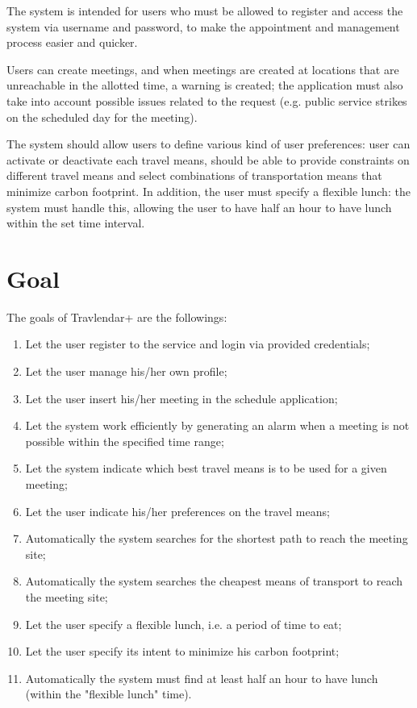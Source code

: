 \documentclass{report}
\begin{document}
	\bigskip
	The system is intended for users who must be allowed to register and access the system via username and password, to make the appointment and management process easier and quicker.

	Users can create meetings, and when meetings are created at locations that are unreachable in the allotted time, a warning is created; the application must also take into account possible issues related to the request (e.g. public service strikes on the scheduled day for the meeting). 
	
	\bigskip
	The system should allow users to define various kind of user preferences: user can activate or deactivate each travel means, should be able to provide constraints on different travel means and select combinations of transportation means that minimize carbon footprint. In addition, the user must specify a flexible lunch: the system must handle this, allowing the user to have half an hour to have lunch within the set time interval.
	
	
	\section{Goal}
	The goals of Travlendar+ are the followings:

	\begin{enumerate}
	\item Let the user register to the service and login via provided credentials;
	\item Let the user manage his/her own profile;
	\item Let the user insert his/her meeting in the schedule application;
	\item Let the system work efficiently by generating an alarm when a meeting is not possible within the specified time range;
	\item Let the system indicate which best travel means is to be used for a given meeting;
	\item Let the user indicate his/her preferences on the travel means;
	\item Automatically the system searches for the shortest path to reach the meeting site;
	\item Automatically the system searches the cheapest means of transport to reach the meeting site;
	\item Let the user specify a flexible lunch, i.e. a period of time to eat;
	\item Let the user specify its intent to minimize his carbon footprint;
	\item Automatically the system must find at least half an hour to have lunch (within the "flexible lunch" time).
	\end{enumerate}
\end{document}
